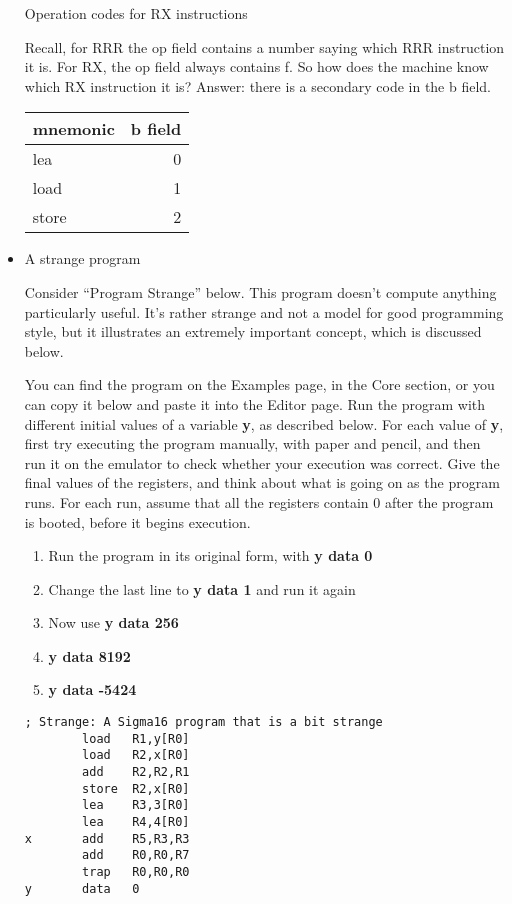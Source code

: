 \documentclass[11pt]{article}
\begin{document}
\begin{itemize}
Operation codes for RX instructions

Recall, for RRR the op field contains a number saying which RRR
instruction it is.  For RX, the op field always contains f.  So how
does the machine know which RX instruction it is?  Answer: there is a
secondary code in the b field.

\begin{center}
\begin{tabular}{lr}
mnemonic & b field\\
\hline
lea & 0\\
load & 1\\
store & 2\\
\end{tabular}
\end{center}

\item A strange program
\label{sec:org0d245f1}

Consider ``Program Strange'' below.  This program doesn't compute
anything particularly useful.  It's rather strange and not a model for
good programming style, but it illustrates an extremely important
concept, which is discussed below.

You can find the program on the Examples page, in the Core section, or
you can copy it below and paste it into the Editor page.  Run the
program with different initial values of a variable \textbf{y}, as described
below.  For each value of \textbf{y}, first try executing the program
manually, with paper and pencil, and then run it on the emulator to
check whether your execution was correct.  Give the final values of
the registers, and think about what is going on as the program runs.
For each run, assume that all the registers contain 0 after the
program is booted, before it begins execution.

\begin{enumerate}
\item Run the program in its original form, with \textbf{y data 0}
\item Change the last line to \textbf{y data 1} and run it again
\item Now use \textbf{y data 256}
\item \textbf{y data 8192}
\item \textbf{y data -5424}
\end{enumerate}

\begin{verbatim}
; Strange: A Sigma16 program that is a bit strange    
        load   R1,y[R0]
        load   R2,x[R0]
        add    R2,R2,R1
        store  R2,x[R0]
        lea    R3,3[R0]
        lea    R4,4[R0]
x       add    R5,R3,R3
        add    R0,R0,R7
        trap   R0,R0,R0
y       data   0
\end{verbatim}


\end{itemize}
\end{document}
